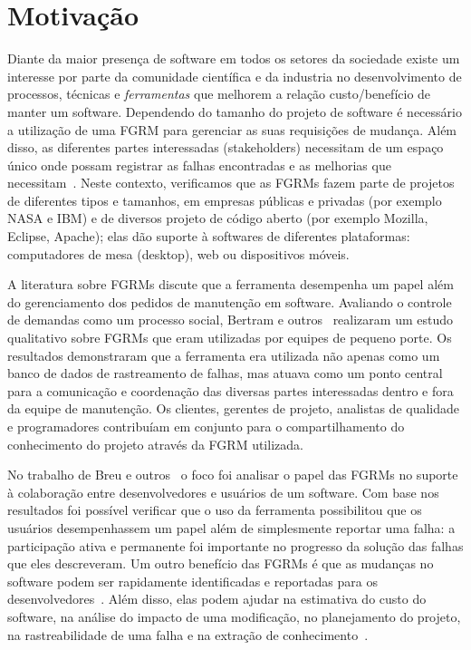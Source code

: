 \section{Motivação}
\label{sec:intro-motivacao}

Diante da maior presença de software em todos os setores da sociedade existe um
interesse por parte da comunidade científica e da industria no desenvolvimento
de processos, técnicas e \textit{ferramentas} que melhorem a relação
custo/benefício de manter um software. Dependendo do tamanho do projeto de
software é necessário a utilização de uma FGRM para gerenciar as suas
requisições de mudança. Além disso, as diferentes partes interessadas
(stakeholders) necessitam de um espaço único onde possam registrar as falhas
encontradas e as melhorias que necessitam~\cite{1407819}. Neste contexto,
verificamos que as FGRMs fazem parte de projetos de diferentes tipos e tamanhos,
em empresas públicas e privadas (por exemplo NASA e IBM) e de diversos projeto
de código aberto (por exemplo Mozilla, Eclipse, Apache); elas dão suporte à
softwares de diferentes plataformas: computadores de mesa (desktop), web ou
dispositivos móveis.


A literatura sobre FGRMs discute que a ferramenta desempenha um papel além do
gerenciamento dos pedidos de manutenção em software. Avaliando o controle de
demandas como um processo social, Bertram e
outros~\cite{Bertram:2010:CCB:1718918.1718972} realizaram um estudo qualitativo
sobre FGRMs que eram utilizadas por equipes de pequeno porte. Os resultados
demonstraram que a ferramenta era utilizada não apenas como um banco de dados de
rastreamento de falhas, mas atuava como um ponto central para a comunicação e
coordenação das diversas partes interessadas dentro e fora da equipe de
manutenção. Os clientes, gerentes de projeto, analistas de qualidade e
programadores contribuíam em conjunto para o compartilhamento do conhecimento do
projeto através da FGRM utilizada.

No trabalho de Breu e outros~\cite{Breu:2010:INB:1718918.1718973} o foco foi
analisar o papel das FGRMs no suporte à colaboração entre desenvolvedores e
usuários de um software. Com base nos resultados foi possível verificar que o
uso da ferramenta possibilitou que os usuários desempenhassem um papel além de
simplesmente reportar uma falha: a participação ativa e permanente foi
importante no progresso da solução das falhas que eles descreveram. Um outro
benefício das FGRMs é que as mudanças no software podem ser rapidamente
identificadas e reportadas para os desenvolvedores~\cite{anvik2005coping}. Além
disso, elas podem ajudar na estimativa do custo do software, na análise do
impacto de uma modificação, no planejamento do projeto, na rastreabilidade de
uma falha e na extração de conhecimento~\cite{cavalcanti2013bug}.

